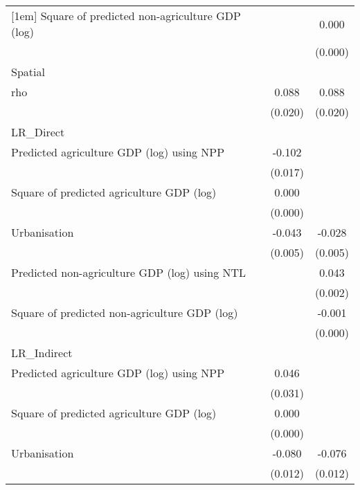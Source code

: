{\begin{tabular}{l*{2}{c}}
[1em]
Square of predicted non-agriculture GDP (log)&                     &       0.000\sym{**} \\
                    &                     &     (0.000)         \\
\hline
Spatial             &                     &                     \\
rho                 &       0.088\sym{***}&       0.088\sym{***}\\
                    &     (0.020)         &     (0.020)         \\
\hline
LR\_Direct           &                     &                     \\
Predicted agriculture GDP (log) using NPP&      -0.102\sym{***}&                     \\
                    &     (0.017)         &                     \\
[1em]
Square of predicted agriculture GDP (log)&       0.000\sym{**} &                     \\
                    &     (0.000)         &                     \\
[1em]
Urbanisation        &      -0.043\sym{***}&      -0.028\sym{***}\\
                    &     (0.005)         &     (0.005)         \\
[1em]
Predicted non-agriculture GDP (log) using NTL&                     &       0.043\sym{***}\\
                    &                     &     (0.002)         \\
[1em]
Square of predicted non-agriculture GDP (log)&                     &      -0.001\sym{***}\\
                    &                     &     (0.000)         \\
\hline
LR\_Indirect         &                     &                     \\
Predicted agriculture GDP (log) using NPP&       0.046         &                     \\
                    &     (0.031)         &                     \\
[1em]
Square of predicted agriculture GDP (log)&       0.000         &                     \\
                    &     (0.000)         &                     \\
[1em]
Urbanisation        &      -0.080\sym{***}&      -0.076\sym{***}\\
                    &     (0.012)         &     (0.012)         \\

\end{tabular}}
